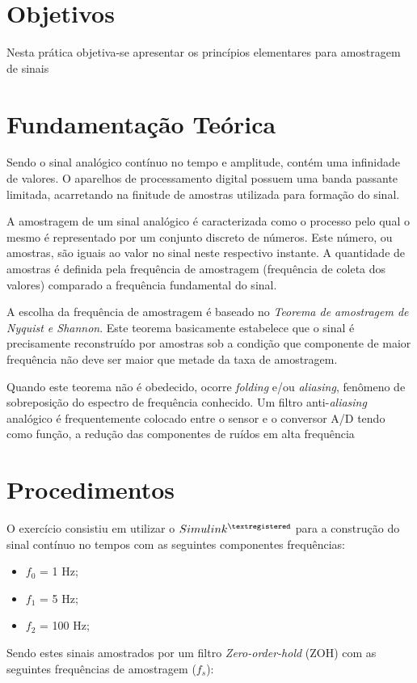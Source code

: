 \section{Objetivos}
Nesta prática objetiva-se apresentar os princípios elementares para amostragem de sinais
\section{Fundamentação Teórica}

Sendo o sinal analógico contínuo no tempo e amplitude, contém uma infinidade de valores. O aparelhos de processamento digital possuem uma banda passante limitada, acarretando na finitude de amostras utilizada para formação do sinal. 

A amostragem de um sinal analógico é caracterizada como o processo pelo qual o mesmo é representado por um conjunto discreto de números. Este número, ou amostras, são iguais ao valor no sinal neste respectivo instante. A quantidade de amostras é definida pela frequência de amostragem (frequência de coleta dos valores) comparado a frequência fundamental do sinal.

A escolha da frequência de amostragem é baseado no \textit{Teorema de amostragem de Nyquist e Shannon}. Este teorema basicamente estabelece que o sinal é precisamente  reconstruído por amostras sob a condição que componente de maior frequência não deve ser maior que metade da taxa de amostragem.

Quando este teorema não é obedecido, ocorre \textit{folding} e/ou \textit{aliasing}, fenômeno de sobreposição do espectro de frequência conhecido. Um filtro anti-\textit{aliasing }analógico é frequentemente colocado entre o sensor e o conversor A/D tendo como função, a redução das componentes de ruídos em alta frequência
\section{Procedimentos}
O exercício consistiu em utilizar o $Simulink^{\textregistered}$ para a construção do sinal contínuo no tempos com as seguintes  componentes frequências:

\begin{itemize}
	\item $f_0$ = 1 Hz;
	\item $f_1$ = 5 Hz;
	\item $f_2$ = 100 Hz; 
\end{itemize}

Sendo estes sinais amostrados  por um filtro \textit{Zero-order-hold} (ZOH) com as seguintes frequências de amostragem ($f_s$):

